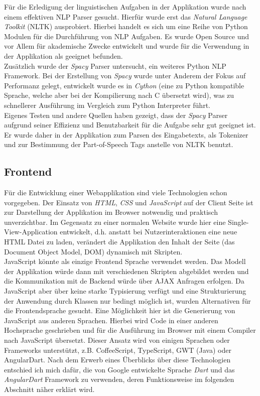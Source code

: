 Für die Erledigung der linguistischen Aufgaben in der Applikation wurde nach einem effektiven NLP Parser gesucht. Hierfür wurde erst das \textit{Natural Language Toolkit} (NLTK)\cite{Bird2004a} ausprobiert. Hierbei handelt es sich um eine Reihe von Python Modulen für die Durchführung von NLP Aufgaben. Es wurde Open Source und vor Allem für akademische Zwecke entwickelt und wurde für die Verwendung in der Applikation als geeignet befunden.\\
Zusätzlich wurde der \textit{Spacy} Parser untersucht, ein weiteres Python NLP Framework. Bei der Erstellung von \textit{Spacy} wurde unter Anderem der Fokus auf Performanz gelegt, entwickelt wurde es in \textit{Cython} (eine zu Python kompatible Sprache, welche aber bei der Kompilierung nach C übersetzt wird), was zu schnellerer Ausführung im Vergleich zum Python Interpreter führt.\\
Eigenes Testen und andere Quellen haben gezeigt, dass der \textit{Spacy} Parser aufgrund seiner Effizienz\cite{Stent2015} und Benutzbarkeit für die Aufgabe sehr gut geeignet ist. Er wurde daher in der Applikation zum Parsen des Eingabetexts, als Tokenizer und zur Bestimmung der Part-of-Speech Tags anstelle von NLTK benutzt.

\subsection{Frontend}

Für die Entwicklung einer Webapplikation sind viele Technologien schon vorgegeben. Der Einsatz von \textit{HTML}, \textit{CSS} und \textit{JavaScript} auf der Client Seite ist zur Darstellung der Applikation im Browser notwendig und praktisch unverzichtbar. Im Gegensatz zu einer normalen Website wurde hier eine Single-View-Application entwickelt, d.h. anstatt bei Nutzerinteraktionen eine neue HTML Datei zu laden, verändert die Applikation den Inhalt der Seite (das Document Object Model, DOM) dynamisch mit Skripten\cite{mikowski2013single}.\\

JavaScript könnte als einzige Frontend Sprache verwendet werden. Das Modell der Applikation würde dann mit verschiedenen Skripten abgebildet werden und die Kommunikation mit de Backend würde über AJAX Anfragen erfolgen. Da JavaScript aber über keine starke Typisierung verfügt und eine Strukturierung der Anwendung durch Klassen nur bedingt möglich ist, wurden Alternativen für die Frontendsprache gesucht. Eine Möglichkeit hier ist die Generierung von JavaScript aus anderen Sprachen. Hierbei wird Code in einer anderen Hochsprache geschrieben und für die Ausführung im Browser mit einem Compiler nach JavaScript übersetzt. Dieser Ansatz wird von einigen Sprachen oder Frameworks unterstützt, z.B. CoffeeScript, TypeScript, GWT (Java) oder AngularDart. Nach dem Erwerb eines Überblicks über diese Technologien entschied ich mich dafür, die von Google entwickelte Sprache \textit{Dart} und das \textit{AngularDart} Framework zu verwenden, deren Funktionsweise im folgenden Abschnitt näher erklärt wird.

